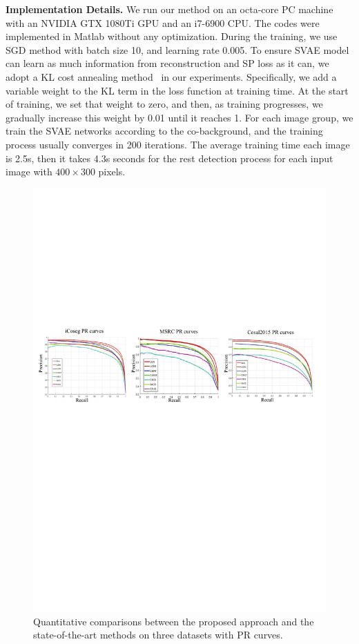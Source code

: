 \documentclass[sigconf]{acmart}
\begin{document}
 \noindent \textbf{Implementation Details.} We run our method on an octa-core PC machine with an NVIDIA GTX 1080Ti GPU and an i7-6900 CPU. The codes were implemented in Matlab without any optimization.  During the training, we use SGD method with batch size 10, and learning rate 0.005.  To ensure SVAE model can learn as much information from reconstruction and SP loss as it can, we adopt a KL cost annealing  method~\cite{bowman2016generating} in our experiments. Specifically, we add a variable weight to the KL term in the loss function at training time. At the start of training, we set that weight to zero, and then, as training progresses, we gradually increase this weight by 0.01 until it reaches 1. For each image group, we train the  SVAE networks according to the co-background, and the training process usually converges in 200 iterations. The average training time each image is 2.5s, then it takes 4.3s seconds for the rest detection process for each input image with $400\times300$ pixels.

\begin{figure}[!h]
\centering
\includegraphics[scale=0.9]{Fig5.pdf}
\caption{Quantitative comparisons between the proposed approach and the state-of-the-art methods on three datasets with PR curves.}
\label{fig:label}
\vspace{-5pt}
\end{figure}
\end{document}
